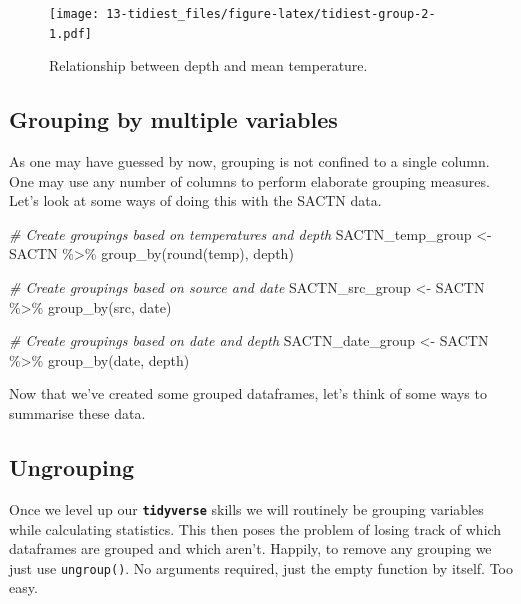 \documentclass[
]{book}
\newenvironment{Shaded}{\begin{snugshade}}{\end{snugshade}}
\newcommand{\CommentTok}[1]{\textcolor[rgb]{0.56,0.35,0.01}{\textit{#1}}}
\newcommand{\FunctionTok}[1]{\textcolor[rgb]{0.00,0.00,0.00}{#1}}
\newcommand{\NormalTok}[1]{#1}
\newcommand{\OtherTok}[1]{\textcolor[rgb]{0.56,0.35,0.01}{#1}}
\newcommand{\SpecialCharTok}[1]{\textcolor[rgb]{0.00,0.00,0.00}{#1}}
\begin{document}
\begin{figure}
\centering
\texttt{[image: 13-tidiest\_files/figure-latex/tidiest-group-2-1.pdf]}
\caption{\label{fig:tidiest-group-2}Relationship between depth and mean temperature.}
\end{figure}

\hypertarget{grouping-by-multiple-variables}{%
\subsection{Grouping by multiple variables}\label{grouping-by-multiple-variables}}

As one may have guessed by now, grouping is not confined to a single column. One may use any number of columns to perform elaborate grouping measures. Let's look at some ways of doing this with the SACTN data.

\begin{Shaded}
\begin{Highlighting}[]
\CommentTok{\# Create groupings based on temperatures and depth}
\NormalTok{SACTN\_temp\_group }\OtherTok{\textless{}{-}}\NormalTok{ SACTN }\SpecialCharTok{\%\textgreater{}\%} 
  \FunctionTok{group\_by}\NormalTok{(}\FunctionTok{round}\NormalTok{(temp), depth)}

\CommentTok{\# Create groupings based on source and date}
\NormalTok{SACTN\_src\_group }\OtherTok{\textless{}{-}}\NormalTok{ SACTN }\SpecialCharTok{\%\textgreater{}\%} 
  \FunctionTok{group\_by}\NormalTok{(src, date)}

\CommentTok{\# Create groupings based on date and depth}
\NormalTok{SACTN\_date\_group }\OtherTok{\textless{}{-}}\NormalTok{ SACTN }\SpecialCharTok{\%\textgreater{}\%} 
  \FunctionTok{group\_by}\NormalTok{(date, depth)}
\end{Highlighting}
\end{Shaded}

Now that we've created some grouped dataframes, let's think of some ways to summarise these data.

\hypertarget{ungrouping}{%
\subsection{Ungrouping}\label{ungrouping}}

Once we level up our \textbf{\texttt{tidyverse}} skills we will routinely be grouping variables while calculating statistics. This then poses the problem of losing track of which dataframes are grouped and which aren't. Happily, to remove any grouping we just use \texttt{ungroup()}. No arguments required, just the empty function by itself. Too easy.
\end{document}
